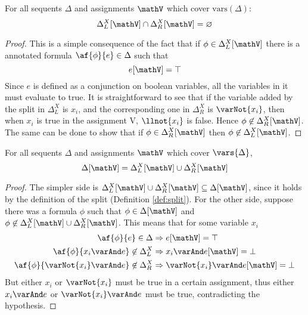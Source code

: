 \begin{lemma}
	\label{lemma:cap}
	For all sequents $\Delta$ and assignments $\mathV$ which cover $\mathrm{vars}(\Delta)$:
	$$ \Delta_L^X[\mathV] \cap \Delta_R^X[\mathV] = \varnothing $$
\end{lemma}
\begin{proof}
	This is a simple consequence of the fact that if $\phi \in \Delta_L^X[\mathV]$ there is a annotated formula $\af{\phi}{e} \in \Delta$ such that 
	$$ e[\mathV] = \top $$
	Since $e$ is defined as a conjunction on boolean variables, all the variables in it must evaluate to true.
	It is straightforward to see that if the variable added by the split in $\Delta_L^X$ is $x_i$, and the corresponding one in $\Delta_R^X$ is $\varNot{x_i}$, then when $x_i$ is true in the assignment V, $\llnot{x_i}$ is false.
	Hence $\phi \not \in \Delta_R^X[\mathV]$.
	The same can be done to show that if $\phi \in \Delta_R^X[\mathV]$ then $\phi \not \in \Delta_L^X[\mathV]$.
\end{proof}
\begin{lemma}
	\label{lemma:cup}
	For all sequents $\Delta$ and assignments $\mathV$ which cover $\vars{\Delta}$,
	$$ \Delta[\mathV] = \Delta_L^X[\mathV] \cup \Delta_R^X[\mathV] $$
\end{lemma}
\begin{proof}
	The simpler side is $\Delta_L^X[\mathV] \cup \Delta_R^X[\mathV] \subseteq \Delta[\mathV]$, since it  holds by the definition of the split (Definition \ref{def:split}).
	For the other side, suppose there was a formula $\phi$ such that $\phi \in \Delta[\mathV]$ and $\phi \not \in \Delta_L^X[\mathV] \cup \Delta_R^X[\mathV]$.
	This means that for some variable $x_i$ 
	\begin{align*}
		\af{\phi}{e} \in \Delta &\Rightarrow e[\mathV] = \top \\
		\af{\phi}{x_i \varAnd e} \not \in \Delta_L^X &\Rightarrow x_i \varAnd e[\mathV] = \bot \\
		\af{\phi}{\varNot{x_i} \varAnd e} \not \in \Delta_R^X &\Rightarrow \varNot{x_i} \varAnd e[\mathV] = \bot
	\end{align*}
	But either $x_i$ or $\varNot{x_i}$ must be true in a certain assignment, thus either $x_i \varAnd e$ or $\varNot{x_i} \varAnd e$ must be true, contradicting the hypothesis.
\end{proof}

